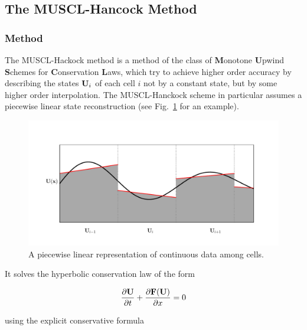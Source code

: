 \subsection{The MUSCL-Hancock Method} \label{chap:MUSCL-hancock}



\subsubsection{Method}

The MUSCL-Hackock method is a method of the class of \textbf{M}onotone
\textbf{U}pwind \textbf{S}chemes for \textbf{C}onservation \textbf{L}aws, which
try to achieve higher order accuracy by describing the states $\mathbf{U}_i$ of each
cell $i$ not by a constant state, but by some higher order interpolation. The
MUSCL-Hanckock scheme in particular assumes a piecewise linear state
reconstruction (see Fig.~\ref{fig:piecewise-linear} for an example).


\begin{figure}[H]
\includegraphics[width=\textwidth]{./figures/piecewise_linear.pdf}%
\caption{
	A piecewise linear representation of continuous data among cells.
	\label{fig:piecewise-linear}
}
\end{figure}


It solves the hyperbolic conservation law of the form

\begin{equation*}
	\frac{\partial \mathbf{U}}{\partial t} + \frac{\partial \mathbf{F}(\mathbf{U})}{\partial x} = 0
\end{equation*}

using the explicit conservative formula


